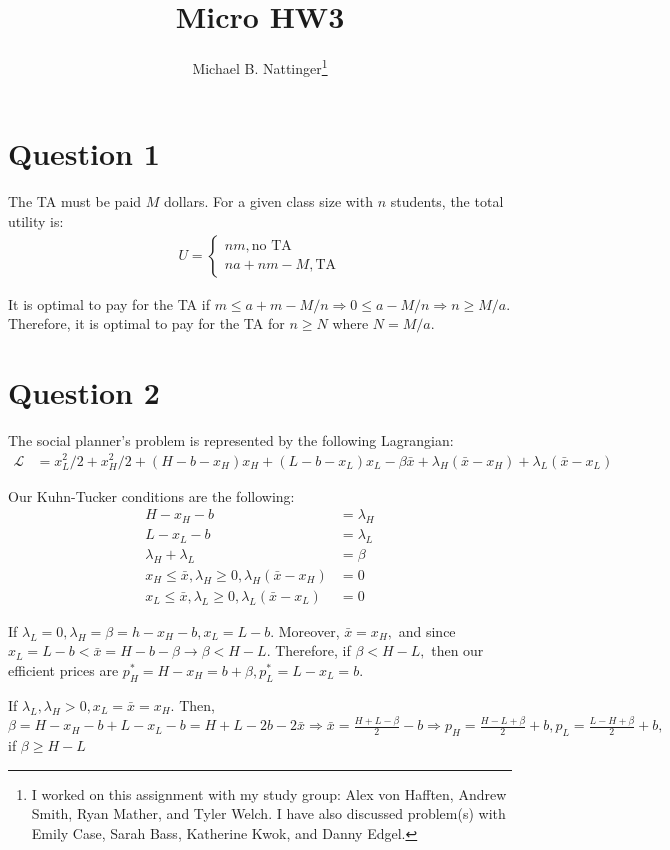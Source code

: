 \documentclass[11pt]{article} %
\title{Micro HW3}
\author{Michael B. Nattinger\footnote{I worked on this assignment with my study group: Alex von Hafften, Andrew Smith, Ryan Mather, and Tyler Welch. I have also discussed problem(s) with Emily Case, Sarah Bass, Katherine Kwok, and Danny Edgel.}}
\begin{document}
\maketitle

\section{Question 1}
The TA must be paid $M$ dollars. For a given class size with $n$ students, the total utility is:
\begin{align*}
U = \begin{cases} nm, \text{no TA} \\ na + nm - M, \text{TA} \end{cases}
\end{align*}

It is optimal to pay for the TA if $m\leq a+m-M/n \Rightarrow 0 \leq a-M/n \Rightarrow n\geq M/a.$ Therefore, it is optimal to pay for the TA for $n\geq N$ where $N = M/a.$

\section{Question 2}

The social planner's problem is represented by the following Lagrangian:
\begin{align*}
\mathcal{L} &= x_L^2/2 + x_H^2/2 +(H - b- x_H)x_H + (L - b - x_L)x_L - \beta\bar{x} + \lambda_H(\bar{x} - x_H) + \lambda_L(\bar{x} - x_L)
\end{align*}

Our Kuhn-Tucker conditions are the following:
\begin{align*}
H - x_H - b &= \lambda_H\\
L - x_L - b &= \lambda_L\\
\lambda_H + \lambda_L &= \beta \\
x_H \leq \bar{x},\lambda_H\geq 0, \lambda_H(\bar{x} - x_H) &= 0\\
x_L \leq \bar{x},\lambda_L\geq 0, \lambda_L(\bar{x} - x_L) &= 0
\end{align*}

If $\lambda_L = 0, \lambda_H = \beta = h - x_H - b, x_L = L - b$. Moreover, $\bar{x} = x_H,$ and since $x_L = L-b < \bar{x} = H - b - \beta \rightarrow \beta<H-L. $ Therefore, if $\beta<H-L,$ then our efficient prices are $p^*_H = H - x_H = b+\beta, p^*_{L} = L - x_L = b.$

If $\lambda_L,\lambda_H > 0, x_L = \bar{x} = x_H.$ Then, $\beta =  H - x_H - b + L - x_L - b = H + L -2b - 2\bar{x} \Rightarrow \bar{x} = \frac{H+L - \beta}{2} - b \Rightarrow p_H =  \frac{H-L + \beta}{2} + b, p_L = \frac{L-H+\beta}{2} +b,$ if $\beta\geq H-L$
\end{document}
